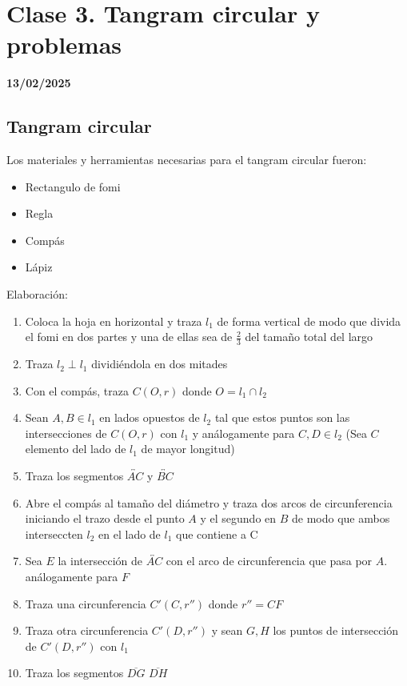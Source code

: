 \chapter{Clase 3. Tangram circular y problemas}
\textbf{13/02/2025}
\section{Tangram circular}

Los materiales y herramientas necesarias para el tangram circular fueron:
    \begin{itemize}
        
        \item Rectangulo de fomi
        \item Regla
        \item Compás
        \item Lápiz
        
    \end{itemize}

Elaboración:
    \begin{enumerate}
        
        \item Coloca la hoja en horizontal y traza $l_1$ de forma vertical de modo que divida el fomi en dos partes y una de ellas sea de $\frac{2}{3}$ del tamaño total del largo
        \item Traza $l_2 \perp l_1$ dividiéndola en dos mitades
        \item Con el compás, traza $C(O,r)$ donde $O = l_1 \cap l_2$
        \item Sean $A,B \in l_1$ en lados opuestos de $l_2$ tal que  estos puntos son las intersecciones de $C(O,r)$ con $l_1$ y análogamente para $C,D \in l_2$ (Sea $C$ elemento del lado de $l_1$ de mayor longitud)
        
         \item Traza los segmentos $\overleftrightarrow{AC}$ y $\overleftrightarrow{BC}$
         \item Abre el compás al tamaño del diámetro y traza dos arcos de circunferencia iniciando el trazo desde el punto $A$ y el segundo en $B$ de modo que ambos interseccten $l_2$ en el lado de $l_1$ que contiene a C
         \item Sea $E$ la intersección de $\overleftrightarrow{AC}$ con el arco de circunferencia que pasa por $A$. análogamente para $F$
         \item Traza una circunferencia $C'(C,r'')$ donde $r'' = CF $

         \item Traza otra circunferencia $C'(D,r'')$ y sean $G,H$ los puntos de intersección de $C'(D,r'')$ con $l_1$
         \item Traza los segmentos $\overline{DG}$ $\overline{DH}$
      \end{enumerate}

